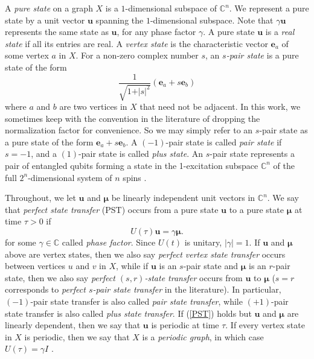 \documentclass{article}
\numberwithin{equation}{section}
\newcommand{\be}{\mathbf e}
\newcommand{\bu}{\mathbf u}
\newcommand{\bmu}{{\boldsymbol{\mu}}}
\def\C{\mathbb{C}}
\begin{document}
{A {\sl pure state} on a graph $X$ is a $1$-dimensional subspace of $\C^{n}$. We represent a pure state by a unit vector $\bu$ spanning the $1$-dimensional subspace. Note that $\gamma\bu$ represents the same state as $\bu$, for any phase factor $\gamma$. A pure state $\bu$ is a {\sl real state} if all its entries are real. A {\sl vertex state} is the characteristic vector $\be_a$ of some vertex $a$ in $X$.
For a non-zero complex number $s$, an {\sl $s$-pair state} is a pure state of the form
\begin{equation*}
\frac{1}{\sqrt{1+\vert s\vert^2}}\left(\be_a+s \be_b\right)
\end{equation*}
where $a$ and $b$ are two vertices in $X$ that need not be adjacent. In this work, we sometimes keep with the convention in the literature \cite{Chen2020PairST} of dropping the normalization factor for convenience. So we may simply refer to an $s$-pair state as a pure state of the form $\be_a+s\be_b$.  A $(-1)$-pair state is called {\sl pair state} if $s=-1$, and a $(1)$-pair state is called {\sl plus state}. 
An $s$-pair state %
represents a pair of entangled qubits forming a state in the 1-excitation subspace $\mathbb C^n$ of the full $2^n$-dimensional system of $n$ spins \cite{kim2024generalization}. 

Throughout, we let $\bu$ and $\bmu$ be linearly independent unit vectors in $\mathbb C^n$. We say that \textit{perfect state transfer} (PST) occurs from a pure state $\bu$ to a pure state $\bmu$ at time $\tau>0$ if
\begin{equation}
\label{PST}
U(\tau)\bu=\gamma\bmu.
\end{equation}
for some $\gamma\in\C$ called \textit{phase factor}. Since $U(t)$ is unitary, $|\gamma|=1$. If $\bu$ and $\bmu$ above are vertex states, then we also say \textit{perfect vertex state transfer} occurs between vertices $u$ and $v$ in $X$, while if $\bu$ is an $s$-pair state and $\bmu$ is an $r$-pair state, then we also say \textit{perfect $(s,r)$-state transfer}  occurs from $\bu$ to $\bmu$ ($s=r$ corresponds to \textit{perfect $s$-pair state transfer} in the literature). In particular, $(-1)$-pair state transfer is also called \textit{pair state transfer}, while $(+1)$-pair state transfer is also called \textit{plus state transfer}. If (\ref{PST}) holds but $\bu$ and $\bmu$ are linearly dependent, then we say that $\bu$ is periodic at time $\tau$. If every vertex state in $X$ is periodic, then we say that $X$ is a \textit{periodic graph}, in which case $U(\tau)=\gamma I$ \cite{godsil2011per}.



}
\end{document}
